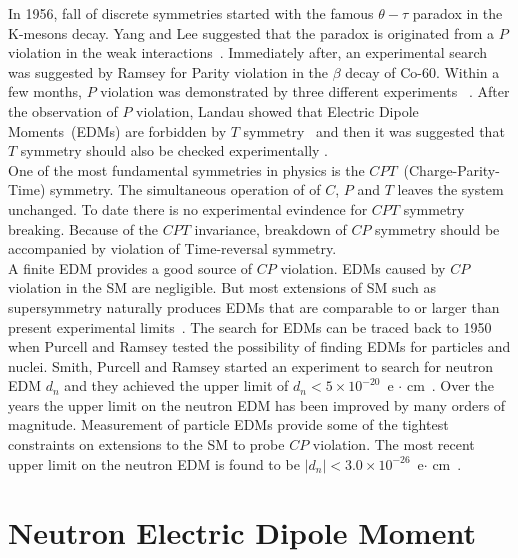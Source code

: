 In 1956, fall of discrete symmetries started with the famous
$\theta-\tau$ paradox in the K-mesons decay. Yang and Lee suggested
that the paradox is originated from a $P$ violation in the weak
interactions~\cite{lee1957parity}. Immediately after, an experimental
search was suggested by Ramsey for Parity violation in the $\beta$
decay of Co-60. Within a few months, $P$ violation was demonstrated by
three different experiments
~\cite{PhysRev.105.1413,PhysRev.105.1415,friedman1957nuclear}.  After
the observation of $P$ violation, Landau showed that Electric Dipole
Moments~(EDMs) are forbidden by $T$
symmetry~\cite{landau1957conservation} and then it was suggested that
$T$ symmetry should also be checked experimentally
\cite{PhysRev.106.517}.  \\

One of the most fundamental symmetries in physics is the
$CPT$~(Charge-Parity-Time) symmetry. The simultaneous operation of of
$C$, $P$ and $T$ leaves the system unchanged. To date there is no
experimental evindence for $CPT$ symmetry breaking.  Because of the
$CPT$ invariance, breakdown of $CP$ symmetry should be accompanied by
violation of Time-reversal symmetry.  \\

A finite EDM provides a good source of $CP$ violation. EDMs caused by
$CP$ violation in the SM are negligible. But most extensions of SM
such as supersymmetry naturally produces EDMs that are comparable to
or larger than present experimental limits~\cite{romalis2001new}.  The
search for EDMs can be traced back to 1950 when Purcell and Ramsey
tested the possibility of finding EDMs for particles and
nuclei. Smith, Purcell and Ramsey started an experiment to search for
neutron EDM $d_n$ and they achieved the upper limit of $d_n < 5 \times
10^{-20}$~e $\cdot$ cm~\cite{smith1957experimental}.  Over the years
the upper limit on the neutron EDM has been improved by many orders of
magnitude. Measurement of particle EDMs provide some of the tightest
constraints on extensions to the SM to probe $CP$ violation. The most
recent upper limit on the neutron EDM is found to be $|d_n| < 3.0
\times 10^{-26} $~e$\cdot$ cm~\cite{pendlebury2015revised}.

\section{Neutron Electric Dipole Moment}


